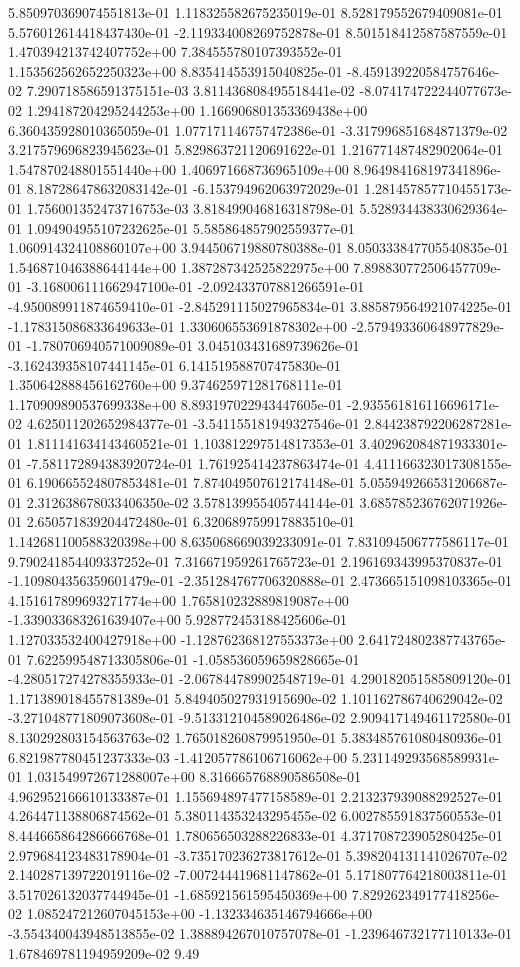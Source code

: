 5.850970369074551813e-01	1.118325582675235019e-01	8.528179552679409081e-01	5.576012614418437430e-01	-2.119334008269752878e-01	8.501518412587587559e-01	1.470394213742407752e+00	7.384555780107393552e-01	1.153562562652250323e+00	8.835414553915040825e-01	-8.459139220584757646e-02	7.290718586591375151e-03	3.811436808495518441e-02	-8.074174722244077673e-02	1.294187204295244253e+00	1.166906801353369438e+00	6.360435928010365059e-01	1.077171146757472386e-01	-3.317996851684871379e-02	3.217579696823945623e-01	5.829863721120691622e-01	1.216771487482902064e-01	1.547870248801551440e+00	1.406971668736965109e+00	8.964984168197341896e-01	8.187286478632083142e-01	-6.153794962063972029e-01	1.281457857710455173e-01	1.756001352473716753e-03	3.818499046816318798e-01	5.528934438330629364e-01	1.094904955107232625e-01	5.585864857902559377e-01	1.060914324108860107e+00	3.944506719880780388e-01	8.050333847705540835e-01	1.546871046388644144e+00	1.387287342525822975e+00	7.898830772506457709e-01	-3.168006111662947100e-01	-2.092433707881266591e-01	-4.950089911874659410e-01	-2.845291115027965834e-01	3.885879564921074225e-01	-1.178315086833649633e-01	1.330606553691878302e+00	-2.579493360648977829e-01	-1.780706940571009089e-01	3.045103431689739626e-01	-3.162439358107441145e-01	6.141519588707475830e-01	1.350642888456162760e+00	9.374625971281768111e-01	1.170909890537699338e+00	8.893197022943447605e-01	-2.935561816116696171e-02	4.625011202652984377e-01	-3.541155181949327546e-01	2.844238792206287281e-01	1.811141634143460521e-01	1.103812297514817353e-01	3.402962084871933301e-01	-7.581172894383920724e-01	1.761925414237863474e-01	4.411166323017308155e-01	6.190665524807853481e-01	7.874049507612174148e-01	5.055949266531206687e-01	2.312638678033406350e-02	3.578139955405744144e-01	3.685785236762071926e-01	2.650571839204472480e-01	6.320689759917883510e-01	1.142681100588320398e+00	8.635068669039233091e-01	7.831094506777586117e-01	9.790241854409337252e-01	7.316671959261765723e-01	2.196169343995370837e-01	-1.109804356359601479e-01	-2.351284767706320888e-01	2.473665151098103365e-01	4.151617899693271774e+00	1.765810232889819087e+00	-1.339033683261639407e+00	5.928772453188425606e-01	1.127033532400427918e+00	-1.128762368127553373e+00	2.641724802387743765e-01	7.622599548713305806e-01	-1.058536059659828665e-01	-4.280517274278355933e-01	-2.067844789902548719e-01	4.290182051585809120e-01	1.171389018455781389e-01	5.849405027931915690e-02	1.101162786740629042e-02	-3.271048771809073608e-01	-9.513312104589026486e-02	2.909417149461172580e-01	8.130292803154563763e-02	1.765018260879951950e-01	5.383485761080480936e-01	6.821987780451237333e-03	-1.412057786106716062e+00	5.231149293568589931e-01	1.031549972671288007e+00	8.316665768890586508e-01	4.962952166610133387e-01	1.155694897477158589e-01	2.213237939088292527e-01	4.264471138806874562e-01	5.380114353243295455e-02	6.002785591837560553e-01	8.444665864286666768e-01	1.780656503288226833e-01	4.371708723905280425e-01	2.979684123483178904e-01	-3.735170236273817612e-01	5.398204131141026707e-02	2.140287139722019116e-02	-7.007244419681147862e-01	5.171807764218003811e-01	3.517026132037744945e-01	-1.685921561595450369e+00	7.829262349177418256e-02	1.085247212607045153e+00	-1.132334635146794666e+00	-3.554340043948513855e-02	1.388894267010757078e-01	-1.239646732177110133e-01	1.678469781194959209e-02	9.49